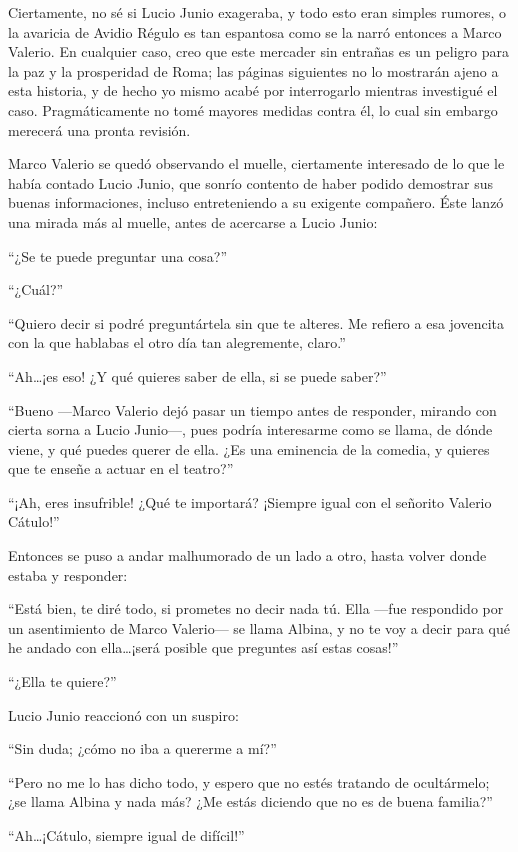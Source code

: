 \documentclass[11pt,openany]{book}
\begin{document}
Ciertamente, no sé si Lucio Junio exageraba, y todo esto eran simples rumores, o la avaricia de Avidio Régulo es tan espantosa como se la narró entonces a Marco Valerio. En cualquier caso, creo que este mercader sin entrañas es un peligro para la paz y la prosperidad de Roma; las páginas siguientes no lo mostrarán ajeno a esta historia, y de hecho yo mismo acabé por interrogarlo mientras investigué el caso. Pragmáticamente no tomé mayores medidas contra él, lo cual sin embargo merecerá una pronta revisión.

Marco Valerio se quedó observando el muelle, ciertamente interesado de lo que le había contado Lucio Junio, que sonrío contento de haber podido demostrar sus buenas informaciones, incluso entreteniendo a su exigente compañero. Éste lanzó una mirada más al muelle, antes de acercarse a Lucio Junio: 

“¿Se te puede preguntar una cosa?” 

“¿Cuál?” 

“Quiero decir si podré preguntártela sin que te alteres. Me refiero a esa jovencita con la que hablabas el otro día tan alegremente, claro.” 

“Ah\dots ¡es eso! ¿Y qué quieres saber de ella, si se puede saber?” 

“Bueno —Marco Valerio dejó pasar un tiempo antes de responder, mirando con cierta sorna a Lucio Junio—, pues podría interesarme como se llama, de dónde viene, y qué puedes querer de ella. ¿Es una eminencia de la comedia, y quieres que te enseñe a actuar en el teatro?” 

“¡Ah, eres insufrible! ¿Qué te importará? ¡Siempre igual con el señorito Valerio Cátulo!” 

Entonces se puso a andar malhumorado de un lado a otro, hasta volver donde estaba y responder: 

“Está bien, te diré todo, si prometes no decir nada tú. Ella —fue respondido por un asentimiento de Marco Valerio— se llama Albina, y no te voy a decir para qué he andado con ella\dots ¡será posible que preguntes así estas cosas!” 

“¿Ella te quiere?” 

Lucio Junio reaccionó con un suspiro: 

“Sin duda; ¿cómo no iba a quererme a mí?” 

“Pero no me lo has dicho todo, y espero que no estés tratando de ocultármelo; ¿se llama Albina y nada más? ¿Me estás diciendo que no es de buena familia?” 

“Ah\dots ¡Cátulo, siempre igual de difícil!”
\end{document}
